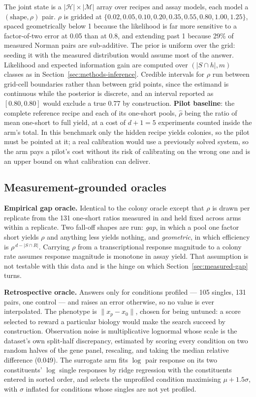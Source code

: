 \documentclass[11pt]{article}
\begin{document}
The joint state is a $\lvert \mathcal{H} \rvert \times \lvert \mathcal{M}
\rvert$ array over recipes and assay models, each model a $(\text{shape},
\rho)$ pair. $\rho$ is gridded at $\{0.02, 0.05, 0.10, 0.20, 0.35, 0.55,
0.80, 1.00, 1.25\}$, spaced geometrically below 1 because the likelihood is
far more sensitive to a factor-of-two error at 0.05 than at 0.8, and extending
past 1 because 29\% of measured Norman pairs are sub-additive. The prior is
uniform over the grid: seeding it with the measured distribution would assume
most of the answer. Likelihood and expected information gain are computed over
$(\lvert S \cap h \rvert, m)$ classes as in Section~\ref{sec:methods-inference}.
Credible intervals for $\rho$ run between grid-cell boundaries rather than
between grid points, since the estimand is continuous while the posterior is
discrete, and an interval reported as $[0.80, 0.80]$ would exclude a true
0.77 by construction. \textbf{Pilot baseline}: the complete reference recipe
and each of its one-short pools, $\hat{\rho}$ being the ratio of mean
one-short to full yield, at a cost of $d + 1 = 5$ experiments counted inside
the arm's total. In this benchmark only the hidden recipe yields colonies, so
the pilot must be pointed at it; a real calibration would use a previously
solved system, so the arm pays a pilot's cost without its risk of calibrating
on the wrong one and is an upper bound on what calibration can deliver.

\subsection{Measurement-grounded oracles}

\textbf{Empirical gap oracle.} Identical to the colony oracle except that
$\rho$ is drawn per replicate from the 131 one-short ratios measured in
\citet{norman2019} and held fixed across arms within a replicate. Two fall-off
shapes are run: \emph{gap}, in which a pool one factor short yields $\rho$ and
anything less yields nothing, and \emph{geometric}, in which efficiency is
$\rho^{\,d - |S \cap R|}$. Carrying $\rho$ from a transcriptional response
magnitude to a colony rate assumes response magnitude is monotone in assay
yield. That assumption is not testable with this data and is the hinge on which
Section~\ref{sec:measured-gap} turns.

\textbf{Retrospective oracle.} Answers only for conditions
\citet{norman2019} profiled --- 105 singles, 131 pairs, one control --- and
raises an error otherwise, so no value is ever interpolated. The phenotype is
$\lVert x_p - x_0 \rVert$, chosen for being untuned: a score selected to reward
a particular biology would make the search succeed by construction.
Observation noise is multiplicative lognormal whose scale is the dataset's own
split-half discrepancy, estimated by scoring every condition on two random
halves of the gene panel, rescaling, and taking the median relative difference
(0.049). The surrogate arm fits $\log$ pair response on its two constituents'
$\log$ single responses by ridge regression with the constituents entered in
sorted order, and selects the unprofiled condition maximising
$\mu + 1.5\sigma$, with $\sigma$ inflated for conditions whose singles are not
yet profiled.
\end{document}
